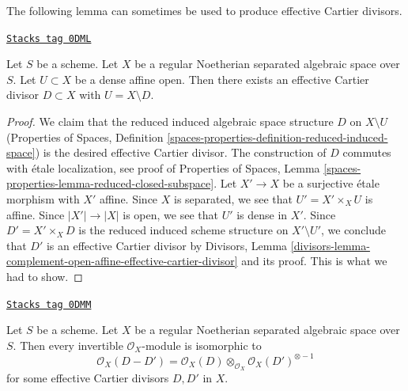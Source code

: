 The following lemma can sometimes be used to produce effective
Cartier divisors.

\begin{lemma}
\label{spaces-divisors-lemma-complement-open-affine-effective-cartier-divisor}
\href{https://stacks.math.columbia.edu/tag/0DML}{\texttt{Stacks tag 0DML}}

Let $S$ be a scheme. Let $X$ be a regular Noetherian separated algebraic space
over $S$. Let $U \subset X$ be a dense affine open. Then there exists an
effective Cartier divisor $D \subset X$ with $U = X \setminus D$.
\end{lemma}

\begin{proof}
We claim that the reduced induced algebraic space structure $D$
on $X \setminus U$ (Properties of Spaces, Definition
\ref{spaces-properties-definition-reduced-induced-space})
is the desired effective Cartier divisor. The construction
of $D$ commutes with \'etale localization, see proof of
Properties of Spaces, Lemma
\ref{spaces-properties-lemma-reduced-closed-subspace}.
Let $X' \to X$ be a surjective \'etale morphism with $X'$ affine.
Since $X$ is separated, we see that $U' = X' \times_X U$ is
affine. Since $|X'| \to |X|$ is open, we see that $U'$
is dense in $X'$. Since $D' = X' \times_X D$ is the reduced induced
scheme structure on $X' \setminus U'$, we conclude that
$D'$ is an effective Cartier divisor by
Divisors, Lemma
\ref{divisors-lemma-complement-open-affine-effective-cartier-divisor}
and its proof. This is what we had to show.
\end{proof}

\begin{lemma}
\label{spaces-divisors-lemma-Noetherian-regular-separated-pic-effective-Cartier}
\href{https://stacks.math.columbia.edu/tag/0DMM}{\texttt{Stacks tag 0DMM}}

Let $S$ be a scheme. Let $X$ be a regular Noetherian separated algebraic space
over $S$. Then every invertible $\mathcal{O}_X$-module is isomorphic to
$$
\mathcal{O}_X(D - D') =
\mathcal{O}_X(D) \otimes_{\mathcal{O}_X} \mathcal{O}_X(D')^{\otimes -1}
$$
for some effective Cartier divisors $D, D'$ in $X$.
\end{lemma}

